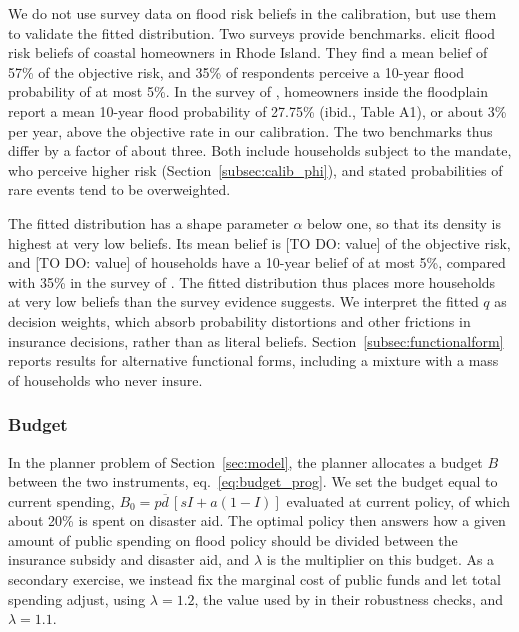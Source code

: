 \documentclass[12pt]{article}
\begin{document}
We do not use survey data on flood risk beliefs in the calibration, but use them to validate the fitted distribution. Two surveys provide benchmarks. \cite{bakkensen2022going} elicit flood risk beliefs of coastal homeowners in Rhode Island. They find a mean belief of 57\% of the objective risk, and 35\% of respondents perceive a 10-year flood probability of at most 5\%. In the survey of \cite{mulder2024mismeasuring}, homeowners inside the floodplain report a mean 10-year flood probability of 27.75\% (ibid., Table A1), or about 3\% per year, above the objective rate in our calibration. The two benchmarks thus differ by a factor of about three. Both include households subject to the mandate, who perceive higher risk (Section~\ref{subsec:calib_phi}), and stated probabilities of rare events tend to be overweighted.

The fitted distribution has a shape parameter $\alpha$ below one, so that its density is highest at very low beliefs. Its mean belief is [TO DO: value] of the objective risk, and [TO DO: value] of households have a 10-year belief of at most 5\%, compared with 35\% in the survey of \cite{bakkensen2022going}. The fitted distribution thus places more households at very low beliefs than the survey evidence suggests. We interpret the fitted $q$ as decision weights, which absorb probability distortions and other frictions in insurance decisions, rather than as literal beliefs. Section~\ref{subsec:functionalform} reports results for alternative functional forms, including a mixture with a mass of households who never insure.

\subsubsection{Budget}

In the planner problem of Section~\ref{sec:model}, the planner allocates a budget $B$ between the two instruments, eq.~\eqref{eq:budget_prog}. We set the budget equal to current spending, $B_0=p\overline{d}\,[sI+a(1-I)]$ evaluated at current policy, of which about 20\% is spent on disaster aid. The optimal policy then answers how a given amount of public spending on flood policy should be divided between the insurance subsidy and disaster aid, and $\lambda$ is the multiplier on this budget. As a secondary exercise, we instead fix the marginal cost of public funds and let total spending adjust, using $\lambda=1.2$, the value used by \cite{gruber2026optimal} in their robustness checks, and $\lambda=1.1$.
\end{document}
